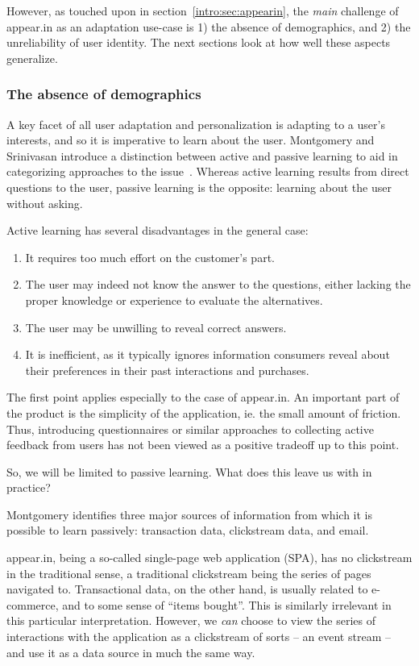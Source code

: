 However, as touched upon in section~\ref{intro:sec:appearin}, the \emph{main} challenge of appear.in as an adaptation use-case is 1) the absence of demographics, and 2) the unreliability of user identity. The next sections look at how well these aspects generalize.

\subsubsection{The absence of demographics}

A key facet of all user adaptation and personalization is adapting to a user's interests, and so it is imperative to learn about the user. Montgomery and Srinivasan introduce a distinction between active and passive learning to aid in categorizing approaches to the issue~\cite{Montgomery2002}. Whereas active learning results from direct questions to the user, passive learning is the opposite: learning about the user without asking.

Active learning has several disadvantages in the general case:

\begin{enumerate}
  \item It requires too much effort on the customer's part.
  \item The user may indeed not know the answer to the questions, either lacking the proper knowledge or experience to evaluate the alternatives.
  \item The user may be unwilling to reveal correct answers.
  \item It is inefficient, as it typically ignores information consumers reveal about their preferences in their past interactions and purchases.
\end{enumerate}

The first point applies especially to the case of appear.in. An important part of the product is the simplicity of the application, ie. the small amount of friction. Thus, introducing questionnaires or similar approaches to collecting active feedback from users has not been viewed as a positive tradeoff up to this point.

So, we will be limited to passive learning. What does this leave us with in practice?

Montgomery identifies three major sources of information from which it is possible to learn passively: transaction data, clickstream data, and email.

appear.in, being a so-called single-page web application (SPA), has no clickstream in the traditional sense, a traditional clickstream being the series of pages navigated to. Transactional data, on the other hand, is usually related to e-commerce, and to some sense of ``items bought''. This is similarly irrelevant in this particular interpretation. However, we \emph{can} choose to view the series of interactions with the application as a clickstream of sorts -- an event stream -- and use it as a data source in much the same way.

